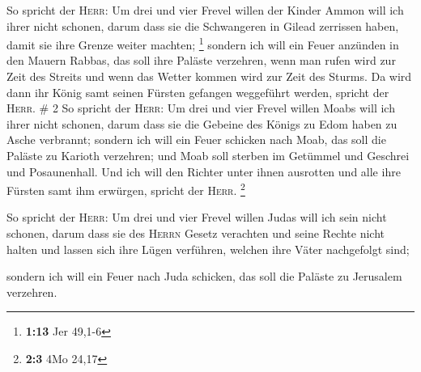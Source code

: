  So spricht der \textsc{Herr}: Um drei und vier Frevel
willen der Kinder Ammon will ich ihrer nicht schonen, darum dass sie die
Schwangeren in Gilead zerrissen haben, damit sie ihre Grenze weiter
machten; \footnote{\textbf{1:13} Jer 49,1-6}  sondern ich
will ein Feuer anzünden in den Mauern Rabbas, das soll ihre Paläste
verzehren, wenn man rufen wird zur Zeit des Streits und wenn das Wetter
kommen wird zur Zeit des Sturms.  Da wird dann ihr König
samt seinen Fürsten gefangen weggeführt werden, spricht der
\textsc{Herr}. \# 2  So spricht der \textsc{Herr}: Um drei
und vier Frevel willen Moabs will ich ihrer nicht schonen, darum dass
sie die Gebeine des Königs zu Edom haben zu Asche verbrannt;
 sondern ich will ein Feuer schicken nach Moab, das soll
die Paläste zu Karioth verzehren; und Moab soll sterben im Getümmel und
Geschrei und Posaunenhall.  Und ich will den Richter unter
ihnen ausrotten und alle ihre Fürsten samt ihm erwürgen, spricht der
\textsc{Herr}. \footnote{\textbf{2:3} 4Mo 24,17}

 So spricht der \textsc{Herr}: Um drei und vier Frevel
willen Judas will ich sein nicht schonen, darum dass sie des
\textsc{Herrn} Gesetz verachten und seine Rechte nicht halten und lassen
sich ihre Lügen verführen, welchen ihre Väter nachgefolgt sind;

 sondern ich will ein Feuer nach Juda schicken, das soll
die Paläste zu Jerusalem verzehren.

